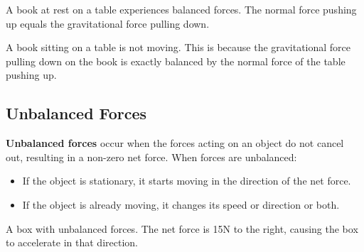 \documentclass[justified,notoc]{tufte-book}
\newcommand{\keyword}[1]{\textbf{#1}\marginnote{\textbf{#1}: }}
\begin{document}
\begin{marginfigure}
    \centering
    \caption{A book at rest on a table experiences balanced forces. The normal force pushing up equals the gravitational force pulling down.}
\end{marginfigure}

\begin{example}
A book sitting on a table is not moving. This is because the gravitational force pulling down on the book is exactly balanced by the normal force of the table pushing up.
\end{example}

\subsection{Unbalanced Forces}

\keyword{Unbalanced forces} occur when the forces acting on an object do not cancel out, resulting in a non-zero net force. When forces are unbalanced:
\begin{itemize}
    \item If the object is stationary, it starts moving in the direction of the net force.
    \item If the object is already moving, it changes its speed or direction or both.
\end{itemize}

\begin{marginfigure}
    \centering
    \caption{A box with unbalanced forces. The net force is 15N to the right, causing the box to accelerate in that direction.}
\end{marginfigure}
\end{document}
